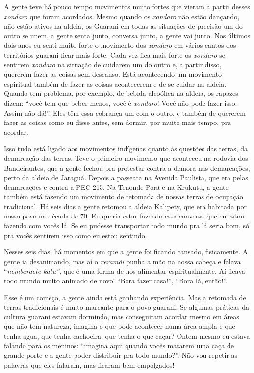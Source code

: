 A gente teve há pouco tempo movimentos muito fortes que vieram a partir
desses \emph{xondaro} que foram acordados. Mesmo quando os
\emph{xondaro} não estão dançando, não estão ativos na aldeia, os
Guarani em todas as situações de precisão um do outro se unem, a gente
senta junto, conversa junto, a gente vai junto. Nos últimos dois anos eu
senti muito forte o movimento dos \emph{xondaro} em vários cantos dos
territórios guarani ficar mais forte. Cada vez fica mais forte os
\emph{xondaro} se sentirem \emph{xondaro} na situação de cuidarem um do
outro e, a partir disso, quererem fazer as coisas sem descanso. Está
acontecendo um movimento espiritual também de fazer as coisas
acontecerem e de se cuidar na aldeia. Quando tem problema, por exemplo,
de bebida alcoólica na aldeia, os rapazes dizem: ``você tem que beber
menos, você é \emph{xondaro}! Você não pode fazer isso. Assim não dá!''.
Eles têm essa cobrança um com o outro, e também de quererem fazer as
coisas como eu disse antes, sem dormir, por muito mais tempo, pra
acordar.

Isso tudo está ligado aos movimentos indígenas quanto às questões das
terras, da demarcação das terras. Teve o primeiro movimento que
aconteceu na rodovia dos Bandeirantes, que a gente fechou pra protestar
contra a demora nas demarcações, perto da aldeia de Jaraguá. Depois a
passeata na Avenida Paulista, que era pelas demarcações e contra a PEC
215. Na Tenonde-Porã e na Krukutu, a gente também está fazendo um
movimento de retomada de nossas terras de ocupação tradicional. Há seis
dias a gente retomou a aldeia Kalipety, que era habitada por nosso povo
na década de 70. Eu queria estar fazendo essa conversa que eu estou
fazendo com vocês lá. Se eu pudesse transportar todo mundo pra lá seria
bom, só pra vocês sentirem isso como eu estou sentindo.

Nesses seis dias, há momentos em que a gente foi ficando cansado,
fisicamente. A gente ia desanimando, mas aí o \emph{xeramõi} punha a mão
na nossa cabeça e falava ``\emph{nembaraete katu'',} que é uma forma de
nos alimentar espiritualmente. Aí ficava todo mundo muito animado de
novo! ``Bora fazer casa!'', ``Bora lá, então!''.

Esse é um começo, a gente ainda está ganhando experiência. Mas a
retomada de terras tradicionais é muito marcante para o povo guarani. Se
algumas práticas da cultura guarani estavam dormindo, mas conseguiram
acordar mesmo em áreas que não tem natureza, imagina o que pode
acontecer numa área ampla e que tenha água, que tenha cachoeira, que
tenha o que caçar? Ontem mesmo eu estava falando para os meninos:
``imagina aqui quando vocês matarem uma caça de grande porte e a gente
poder distribuir pra todo mundo?''. Não vou repetir as palavras que eles
falaram, mas ficaram bem empolgados!

